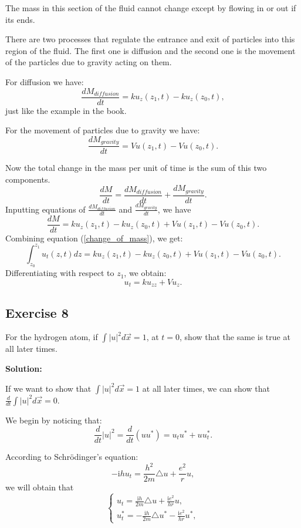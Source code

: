 \documentclass{article}
\begin{document}
			The mass in this section of the fluid cannot change
			except by flowing in or out if its ends.

			There are two processes that regulate the entrance and
			exit of particles into this region of the fluid.
			The first one is diffusion and the second one is the
			movement of the particles due to gravity acting on
			them.

			For diffusion we have:
			\[\frac{dM_{diffusion}}{dt}=ku_z(z_1,t)-ku_z(z_0,t),\]
			just like the example in the book.

			For the movement of particles due to gravity we have:
			\[\frac{dM_{gravity}}{dt} = Vu(z_1,t) - Vu(z_0,t).\]

			Now the total change in the mass per unit of time is
			the sum of this two components.
			\[\frac{dM}{dt}=\frac{dM_{diffusion}}{dt}+\frac{dM_{gravity}}{dt}.\]
			Inputting equations of $\frac{dM_{diffusion}}{dt} $ and $\frac{dM_{gravity}}{dt} $, we have
            \[\frac{dM}{dt}=ku_z(z_1,t)-ku_z(z_0,t) + Vu(z_1,t) - Vu(z_0,t). \]			
			Combining equation (\ref{change_of_mass}), we get:
			\[\int_{z_0}^{z_1}u_t(z,t)dz= ku_z(z_1,t)-ku_z(z_0,t) + Vu(z_1,t) - Vu(z_0,t).\]
			Differentiating with respect to $z_1$, we obtain:
			\[
				u_t=ku_{zz}+Vu_z.
			\]

		\subsection{Exercise 8}
	For the hydrogen atom, if $ \int \left | u \right |^2 d \vec{x } =1$, at $t=0$, show that the same is true at all later times.
		
	\textbf{Solution:}

		If we want to show that $ \int \left | u \right |^2 d \vec{x } =1$ at all later times, we can show that $\frac{d}{dt}\int \left | u \right |^2 d \vec{x } =0$.
                  
		We begin by noticing that:
		\begin{equation} \label{d|u|^2/dt}
			 \frac{d}{dt} \left | u \right |^2= \frac{d}{dt} \left(uu^* \right)= u_{t}u^*+uu_{t}^*.
		\end{equation}

		According to Schr\"{o}dinger's equation:
		\[-\mathrm{i}hu_{t}=\frac{h^2}{2m}\triangle u+ \frac{e^2}{r}u,\]
		we will obtain that
		\begin{equation*}
			\begin{cases}
				u_{t}=\frac{\mathrm{i}h}{2m}\triangle u+ \frac{\mathrm{i}e^2}{hr}u,
				\\
				u_{t}^*=-\frac{\mathrm{i}h}{2m}\triangle u^*-\frac{\mathrm{i}e^2}{hr}u^*,
			\end{cases}
		\end{equation*}
\end{document}
